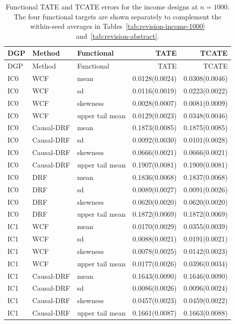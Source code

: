 \begingroup
\scriptsize
\setlength{\tabcolsep}{4pt}
\begin{longtable}{lllrr}
\caption{Functional TATE and TCATE errors for the income designs at $n=1000$. The four functional targets are shown separately to complement the within-seed averages in Tables~\ref{tab:revision-income-1000} and~\ref{tab:revision-abstract}.}\label{tab:revision-functional-detail}\\
\toprule
DGP & Method & Functional & TATE & TCATE \\
\midrule
\endfirsthead
\toprule
DGP & Method & Functional & TATE & TCATE \\
\midrule
\endhead
IC0 & WCF & mean & 0.0128(0.0024) & 0.0308(0.0046) \\
IC0 & WCF & sd & 0.0116(0.0019) & 0.0223(0.0022) \\
IC0 & WCF & skewness & 0.0028(0.0007) & 0.0081(0.0009) \\
IC0 & WCF & upper tail mean & 0.0129(0.0023) & 0.0348(0.0046) \\
IC0 & Causal-DRF & mean & 0.1873(0.0085) & 0.1875(0.0085) \\
IC0 & Causal-DRF & sd & 0.0092(0.0030) & 0.0101(0.0028) \\
IC0 & Causal-DRF & skewness & 0.0666(0.0021) & 0.0666(0.0021) \\
IC0 & Causal-DRF & upper tail mean & 0.1907(0.0081) & 0.1909(0.0081) \\
IC0 & DRF & mean & 0.1836(0.0068) & 0.1837(0.0068) \\
IC0 & DRF & sd & 0.0089(0.0027) & 0.0091(0.0026) \\
IC0 & DRF & skewness & 0.0620(0.0020) & 0.0620(0.0020) \\
IC0 & DRF & upper tail mean & 0.1872(0.0069) & 0.1872(0.0069) \\
IC1 & WCF & mean & 0.0170(0.0029) & 0.0355(0.0039) \\
IC1 & WCF & sd & 0.0088(0.0021) & 0.0191(0.0021) \\
IC1 & WCF & skewness & 0.0078(0.0025) & 0.0142(0.0023) \\
IC1 & WCF & upper tail mean & 0.0177(0.0026) & 0.0396(0.0034) \\
IC1 & Causal-DRF & mean & 0.1643(0.0090) & 0.1646(0.0090) \\
IC1 & Causal-DRF & sd & 0.0086(0.0026) & 0.0096(0.0024) \\
IC1 & Causal-DRF & skewness & 0.0457(0.0023) & 0.0459(0.0022) \\
IC1 & Causal-DRF & upper tail mean & 0.1661(0.0087) & 0.1663(0.0088) \\

\end{longtable}
